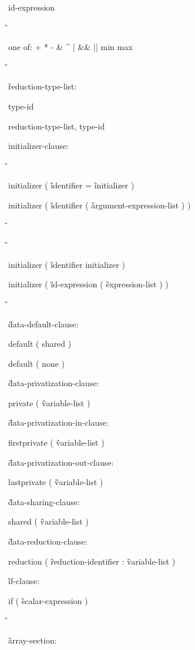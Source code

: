 {\cppspecificstart

\I id-expression 

\G\cppspecificend

\ccppspecificstart

\I one of: \C + * - \& \^ { } \C | \&\& || min max 

\G\ccppspecificend

\G reduction-type-list: 

\I type-id 

\I reduction-type-list, type-id 

\begin{samepage}
initializer-clause: 

\G\cspecificstart

\C\I initializer ( \G identifier \C = \G initializer \C )

\C\I initializer ( \G identifier \C ( \G argument-expression-list \C ) ) 

\G\cspecificend
\end{samepage}

\G\cppspecificstart

\C\I initializer \C ( \G identifier initializer \C )

\I initializer \C ( \G id-expression \C ( \G expression-list \C ) ) 

\G\cppspecificend

\G data-default-clause:

\C\I default ( shared )

\I default ( none )

\G data-privatization-clause:

\C\I private ( \G variable-list \C )

\G data-privatization-in-clause:

\C\I firstprivate ( \G variable-list \C )

\G data-privatization-out-clause:

\C\I lastprivate ( \G variable-list \C )

\G data-sharing-clause:

\C\I shared ( \G variable-list \C )

\G data-reduction-clause:

\C\I reduction ( \G reduction-identifier \C : \G variable-list \C )

\G if-clause:

\C\I if ( \G scalar-expression \C )

\G\cspecificstart

\G array-section:

}

